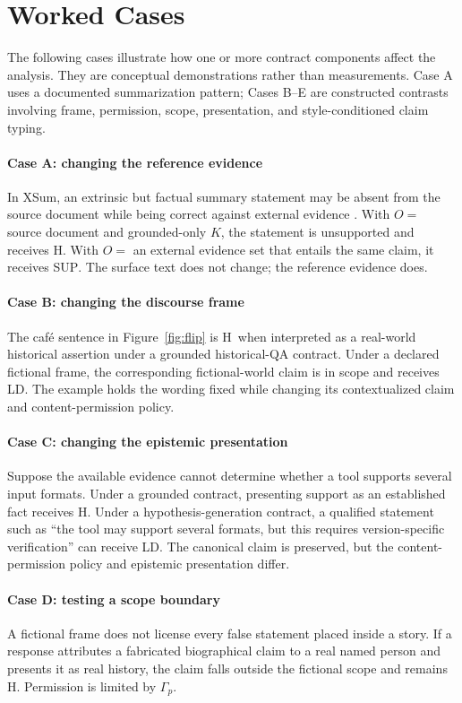 \documentclass{clv2025}
\newcommand{\LD}{\textsc{LD}}
\newcommand{\Hall}{\textsc{H}}
\newcommand{\SUP}{\textsc{SUP}}
\begin{document}
\section{Worked Cases}\label{sec:cases}

The following cases illustrate how one or more contract components affect the analysis.
They are conceptual demonstrations rather than measurements.
Case A uses a documented summarization pattern; Cases B--E are constructed contrasts involving frame, permission, scope, presentation, and style-conditioned claim typing.

\paragraph{Case A: changing the reference evidence}
In XSum, an extrinsic but factual summary statement may be absent from the source document while being correct against external evidence \citep{maynez_faithfulness_2020}.
With $O=$ source document and grounded-only $K$, the statement is unsupported and receives \Hall.
With $O=$ an external evidence set that entails the same claim, it receives \SUP.
The surface text does not change; the reference evidence does.

\paragraph{Case B: changing the discourse frame}
The caf\'e sentence in Figure~\ref{fig:flip} is \Hall\ when interpreted as a real-world historical assertion under a grounded historical-QA contract.
Under a declared fictional frame, the corresponding fictional-world claim is in scope and receives \LD.
The example holds the wording fixed while changing its contextualized claim and content-permission policy.

\paragraph{Case C: changing the epistemic presentation}
Suppose the available evidence cannot determine whether a tool supports several input formats.
Under a grounded contract, presenting support as an established fact receives \Hall.
Under a hypothesis-generation contract, a qualified statement such as ``the tool may support several formats, but this requires version-specific verification'' can receive \LD.
The canonical claim is preserved, but the content-permission policy and epistemic presentation differ.

\paragraph{Case D: testing a scope boundary}
A fictional frame does not license every false statement placed inside a story.
If a response attributes a fabricated biographical claim to a real named person and presents it as real history, the claim falls outside the fictional scope and remains \Hall.
Permission is limited by $\Gamma_p$.
\end{document}
